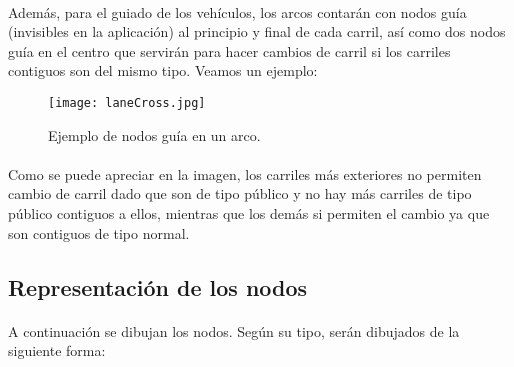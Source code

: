 	\paragraph{}
	Además, para el guiado de los vehículos, los arcos contarán con nodos guía (invisibles en la aplicación) al principio y final de cada carril, así como dos nodos guía en el centro que servirán para hacer cambios de carril si los carriles contiguos son del mismo tipo. Veamos un ejemplo:
	
	\begin{figure}[H]
		\centering
			\texttt{[image: laneCross.jpg]}
	\caption{Ejemplo de nodos guía en un arco.}
	\label{fig:laneCross}
	\end{figure}
	
	\paragraph{}
	Como se puede apreciar en la imagen, los carriles más exteriores no permiten cambio de carril dado que son de tipo público y no hay más carriles de tipo público contiguos a ellos, mientras que los demás si permiten el cambio ya que son contiguos de tipo normal.
	
	\subsection{Representación de los nodos}
	\paragraph{}
	A continuación se dibujan los nodos. Según su tipo, serán dibujados de la siguiente forma:
	

